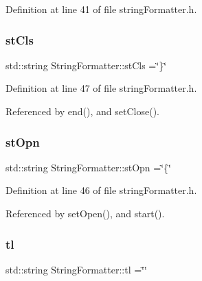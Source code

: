Definition at line 41 of file string\+Formatter.\+h.

\mbox{\label{classStringFormatter_a90dc61f197d9611b6d85b1eb251507b7}} 
\subsubsection{\texorpdfstring{st\+Cls}{stCls}}
{\footnotesize\ttfamily std\+::string String\+Formatter\+::st\+Cls =\char`\"{}\}\char`\"{}\hspace{0.3cm}{\ttfamily [private]}}



Definition at line 47 of file string\+Formatter.\+h.



Referenced by end(), and set\+Close().

\mbox{\label{classStringFormatter_ab29fbaab2f88ecef0334b8f2ee3f77bc}} 
\subsubsection{\texorpdfstring{st\+Opn}{stOpn}}
{\footnotesize\ttfamily std\+::string String\+Formatter\+::st\+Opn =\char`\"{}\{\char`\"{}\hspace{0.3cm}{\ttfamily [private]}}



Definition at line 46 of file string\+Formatter.\+h.



Referenced by set\+Open(), and start().

\mbox{\label{classStringFormatter_a81440b72b762c4ac312730ae61ad0acd}} 
\subsubsection{\texorpdfstring{tl}{tl}}
{\footnotesize\ttfamily std\+::string String\+Formatter\+::tl =\char`\"{}\char`\"{}\hspace{0.3cm}{\ttfamily [private]}}



